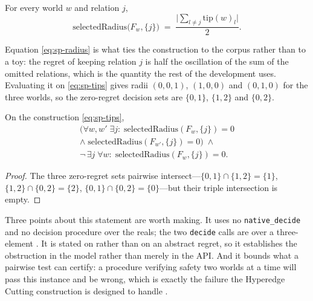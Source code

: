 \begin{proposition}
\label{prop:sp-radius}
For every world $w$ and relation $j$,
\begin{equation}
\mathrm{selectedRadius}\bigl(F_{w},\{j\}\bigr)
\;=\;\frac{\bigl|\sum_{l\neq j}\mathrm{tip}(w)_{l}\bigr|}{2}.
\label{eq:sp-radius}
\end{equation}
\end{proposition}


Equation \eqref{eq:sp-radius} is what ties the construction to the corpus rather than to a toy:
the regret of keeping relation $j$ is half the oscillation of the sum of the omitted
relations, which is the quantity the rest of the development uses. Evaluating it on
\eqref{eq:sp-tips} gives radii $(0,0,1)$, $(1,0,0)$ and $(0,1,0)$ for the three worlds, so the
zero-regret decision sets are $\{0,1\}$, $\{1,2\}$ and $\{0,2\}$.

\begin{theorem}
\label{thm:sp-threeworld}
On the construction \eqref{eq:sp-tips},
\begin{multline}
\bigl(\forall w,w'\;\exists j:\;
 \mathrm{selectedRadius}(F_{w},\{j\})=0 \\ \wedge\;
 \mathrm{selectedRadius}(F_{w'},\{j\})=0\bigr)
\;\wedge\;\\
\neg\,\exists j\;\forall w:\;\mathrm{selectedRadius}(F_{w},\{j\})=0 .
\label{eq:sp-threeworld}
\end{multline}
\end{theorem}

\begin{proof}
The three zero-regret sets pairwise intersect---$\{0,1\}\cap\{1,2\}=\{1\}$,
$\{1,2\}\cap\{0,2\}=\{2\}$, $\{0,1\}\cap\{0,2\}=\{0\}$---but their triple intersection is
empty.
\end{proof}


Three points about this statement are worth making. It uses no \texttt{native\_decide} and no
decision procedure over the reals; the two \texttt{decide} calls are over a three-element
. It is stated on  rather than on an abstract
regret, so it establishes the obstruction in the model rather than merely in the API. And it
bounds what a pairwise test can certify: a procedure verifying safety two worlds at a time
will pass this instance and be wrong, which is exactly the failure the Hyperedge Cutting
construction is designed to handle \cite{javdani2014}.

